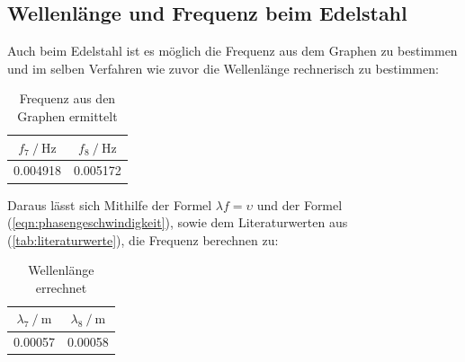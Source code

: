     \subsection{Wellenlänge und Frequenz beim Edelstahl}
    Auch beim Edelstahl ist es möglich die Frequenz aus dem Graphen zu bestimmen und im selben Verfahren wie zuvor die Wellenlänge rechnerisch zu bestimmen:
\begin{table}
        \centering
            \begin{tabular}{c c}
            \toprule
            {$ f_7 \mathbin{/} \si{\hertz} $}
            & {$ f_8 \mathbin{/} \si{\hertz} $} \\
            \midrule
            0.004918 & 0.005172 \\
            \bottomrule
            \end{tabular}
        \caption{Frequenz aus den Graphen ermittelt}
        \label{tab:MesWellen}
    \end{table}

    Daraus lässt sich Mithilfe der Formel $\lambda f = \upsilon$ und der Formel (\ref{eqn:phasengeschwindigkeit}), sowie dem Literaturwerten aus (\ref{tab:literaturwerte}), die Frequenz berechnen zu:
\begin{table}
        \centering
            \begin{tabular}{c c}
            \toprule
            {$   \lambda_7 \mathbin{/} \si{\meter} $}
            & {$ \lambda_8 \mathbin{/} \si{\meter} $} \\
            \midrule
            0.00057 & 0.00058 \\
            \bottomrule
            \end{tabular}
        \caption{Wellenlänge errechnet}
        \label{tab:MesWellene}
    \end{table}